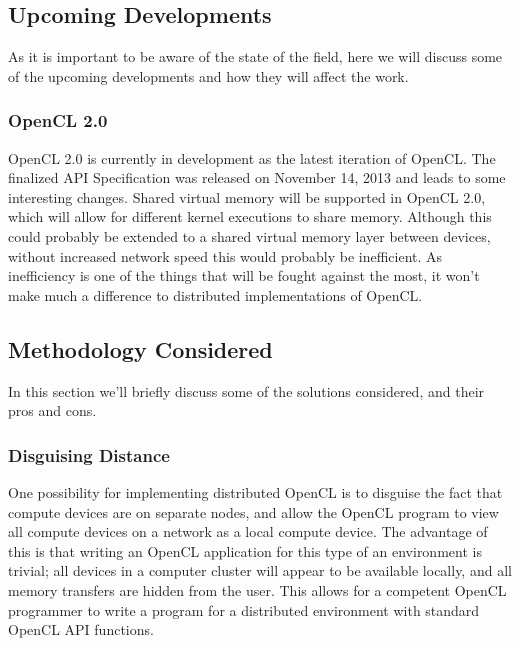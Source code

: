 \documentclass[../thesis.tex]{subfiles}
\begin{document}
    \subsection{Upcoming Developments} %
    \label{sub:upcoming_developments}
    As it is important to be aware of the state of the field, here we will discuss some of the upcoming developments and how they will affect the work.
        \subsubsection{OpenCL 2.0} %
        \label{ssub:opencl_2_0}
        OpenCL 2.0 is currently in development as the latest iteration of OpenCL. The finalized API Specification was released on November 14, 2013 and leads to some interesting changes. Shared virtual memory will be supported in OpenCL 2.0, which will allow for different kernel executions to share memory. Although this could probably be extended to a shared virtual memory layer between devices, without increased network speed this would probably be inefficient. As inefficiency is one of the things that will be fought against the most, it won't make much a difference to distributed implementations of OpenCL.

    \subsection{Methodology Considered} %
    \label{sub:methodology_considered}
    In this section we'll briefly discuss some of the solutions considered, and their pros and cons.
        \subsubsection{Disguising Distance} %
        \label{ssub:disguising_distance}
            One possibility for implementing distributed OpenCL is to disguise the fact that compute devices are on separate nodes, and allow the OpenCL program to view all compute devices on a network as a local compute device. The advantage of this is that writing an OpenCL application for this type of an environment is trivial; all devices in a computer cluster will appear to be available locally, and all memory transfers are hidden from the user. This allows for a competent OpenCL programmer to write a program for a distributed environment with standard OpenCL API functions.
\end{document}
